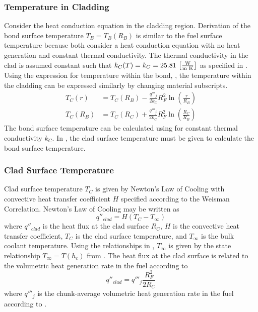     \subsubsection{Temperature in Cladding}
      Consider the heat conduction equation in the cladding region. Derivation
      of the bond surface temperature $T_B=T_B(R_B)$ is similar to
      the fuel surface temperature because both consider a heat conduction
      equation with no heat generation and constant thermal conductivity. The
      thermal conductivity in the clad is assumed constant such that $k_C(T) =
      k_C = 25.81 \,\left[\text{{$\frac{\text{W}}{\text{m K}}$}}\right]$ as specified in
      .
      Using the expression for temperature within the bond,
      , the temperature within the cladding can be expressed
      similarly by changing material subscripts. 
      \begin{align}
        \label{eq:tcr}
        T_C(r) &= T_C(R_B) - \frac{q'''_j}{2 k_C} R_F^2
          \ln\left(\frac{r}{R_B}\right) \\
        \label{eq:tb_forward}
        T_C(R_B) &= T_C(R_C) + \frac{q'''_j}{2 k_C} R_F^2
          \ln\left(\frac{R_C}{R_B}\right)
      \end{align}
      The bond surface temperature can be calculated using 
      for constant thermal conductivity $k_C$. In , the clad
      surface temperature must be given to calculate the bond surface
      temperature.

    \subsubsection{Clad Surface Temperature}
      Clad surface temperature $T_C$ is given by Newton's Law of Cooling with
      convective heat transfer coefficient $H$ specified according to the
      Weisman Correlation. Newton's Law of Cooling may be written as
      \begin{equation}
        q''_{clad} = H (T_C - T_{\infty})
      \end{equation}
      where $q''_{clad}$ is the heat flux at the clad surface $R_C$, $H$ is
      the convective heat transfer coefficient, $T_C$ is the clad surface
      temperature, and $T_{\infty}$ is the bulk coolant temperature. Using the
      relationships in , $T_{\infty}$ is given
      by the state relationship $T_{\infty} = T(h_c)$ from \cite{sodiumProp}.
      The heat flux at the clad surface is related to the volumetric heat 
      generation rate in the fuel according to 
      \begin{equation}
        q''_{clad} = q'''_j \frac{R_F^2}{2 R_C}
      \end{equation}
      where $q'''_j$ is the chunk-average volumetric heat generation rate in the
      fuel according to .

